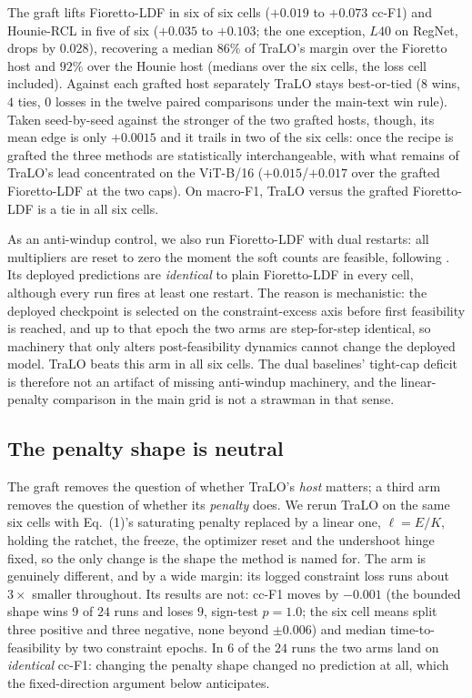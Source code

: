 \documentclass[letterpaper]{article}
\begin{document}
The graft lifts Fioretto-LDF in six of six cells ($+0.019$ to $+0.073$ cc-F1) and
Hounie-RCL in five of six ($+0.035$ to $+0.103$; the one exception, $L40$ on RegNet,
drops by $0.028$), recovering a median $86\%$ of TraLO's margin over the Fioretto host
and $92\%$ over the Hounie host (medians over the six cells, the loss cell included).
Against each grafted host separately TraLO stays best-or-tied ($8$ wins, $4$ ties, $0$
losses in the twelve paired comparisons under the main-text win rule). Taken seed-by-seed
against the stronger of the two grafted hosts, though, its mean edge is only $+0.0015$ and
it trails in two of the six cells: once the recipe is grafted the three methods are
statistically interchangeable, with what remains of TraLO's lead concentrated on the
ViT-B/16 ($+0.015$/$+0.017$ over the grafted Fioretto-LDF at the two caps). On macro-F1,
TraLO versus the grafted Fioretto-LDF is a tie in all six cells.

As an anti-windup control, we also run Fioretto-LDF with dual restarts: all multipliers
are reset to zero the moment the soft counts are feasible, following
\citet{gallego2022controlled}. Its deployed predictions are \emph{identical} to plain
Fioretto-LDF in every cell, although every run fires at least one restart. The reason is
mechanistic: the deployed checkpoint is selected on the constraint-excess axis before
first feasibility is reached, and up to that epoch the two arms are step-for-step
identical, so machinery that only alters post-feasibility dynamics cannot change the
deployed model. TraLO beats this arm in all six cells. The dual baselines' tight-cap
deficit is therefore not an artifact of missing anti-windup machinery, and the
linear-penalty comparison in the main grid is not a strawman in that sense.

\subsection{The penalty shape is neutral}
\label{app:shape}

The graft removes the question of whether TraLO's \emph{host} matters; a third arm
removes the question of whether its \emph{penalty} does. We rerun TraLO on the same six
cells with Eq.~(1)'s saturating penalty replaced by a linear one, $\ell = E/K$, holding
the ratchet, the freeze, the optimizer reset and the undershoot hinge fixed, so the only
change is the shape the method is named for. The arm is genuinely different, and by a
wide margin: its logged constraint loss runs about $3\times$ smaller throughout. Its
results are not: cc-F1 moves by $-0.001$ (the bounded shape wins $9$ of $24$ runs and
loses $9$, sign-test $p{=}1.0$; the six cell means split three positive and three
negative, none beyond $\pm0.006$) and median time-to-feasibility by two constraint
epochs. In $6$ of the $24$ runs the two arms land on \emph{identical} cc-F1: changing the
penalty shape changed no prediction at all, which the fixed-direction argument below
anticipates.
\end{document}
